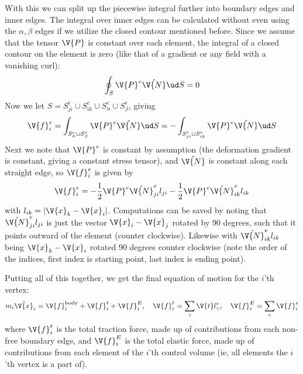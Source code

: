 \documentclass[sigconf]{acmart}
\begin{document}
With this we can split up the piecewise integral further into boundary edges and inner edges. The integral over inner edges can be calculated without even using the $ \alpha, \beta $ edges if we utilize the closed contour mentioned before. Since we assume that the tensor $ \V{P} $ is constant over each element, the integral of a closed contour on the element is zero (like that of a gradient or any field with a vanishing curl):
\begin{equation}\label{key}
	\oint_S \V{P}^e\hat{\V{N}} \ud S = 0
\end{equation}
Now we let $ S = S^e_{ji} \cup S^e_{ik} \cup S^e_{\alpha} \cup S^e_{\beta} $, giving
\begin{equation}\label{key}
	\V{f}^e_i = \int_{S^e_{\alpha} \cup S^e_{\beta}} \V{P}^e\hat{\V{N}} \ud S = -\int_{S^e_{ji} \cup S^e_{ik}} \V{P}^e\hat{\V{N}} \ud S
\end{equation}
Next we note that $ \V{P}^e $ is constant by assumption (the deformation gradient is constant, giving a constant stress tensor), and $ \hat{\V{N}} $ is constant along each straight edge, so $ \V{f}^e_i $ is given by
\begin{equation}\label{key}
\V{f}^e_i = -\frac{1}{2} \V{P}^e \hat{\V{N}}^e_{ji}l_{ji} - \frac{1}{2} \V{P}^e\hat{\V{N}}^e_{ik}l_{ik}
\end{equation}
with $ l_{ik} = |\V{x}_k - \V{x}_i|$. Computations can be saved by noting that $ \hat{\V{N}}^e_{ji} l_{ji} $ is just the vector $ \V{x}_i-\V{x}_j $ rotated by 90 degrees, such that it points outward of the element (counter clockwise). Likewise with $ \hat{\V{N}}^e_{ik} l_{ik} $ being $ \V{x}_k -\V{x}_i$ rotated 90 degrees counter clockwise (note the order of the indices, first index is starting point, last index is ending point).

Putting all of this together, we get the final equation of motion for the $ i $'th vertex:
\begin{equation}\label{key}
	m_i \ddot{\V{x}}_i = \V{f}_i^{\text{body}} + \V{f}_i^t +\V{f}^E_i, \quad \V{f}^t_i = \sum_{\gamma}   \V{t}l^e_{\gamma}, \quad \V{f}^E_i = \sum_e \V{f}^e_i
\end{equation}
where $ \V{f}^t_i $ is the total traction force, made up of contributions from each non-free boundary edge, and $ \V{f}^E_i $ is the total elastic force, made up of contributions from each element of the $ i $'th control volume (ie, all elements the $ i $'th vertex is a part of).
\end{document}
